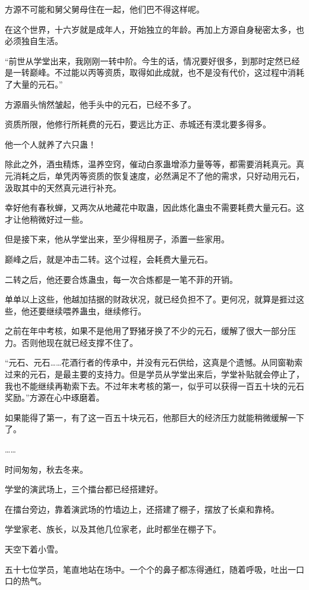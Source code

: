 \begin{this_body}
方源不可能和舅父舅母住在一起，他们巴不得这样呢。

在这个世界，十六岁就是成年人，开始独立的年龄。再加上方源自身秘密太多，也必须独自生活。

“前世从学堂出来，我刚刚一转中阶。今生的话，情况要好很多，到那时定然已经是一转巅峰。不过能以丙等资质，取得如此成就，也不是没有代价，这过程中消耗了大量的元石。”

方源眉头悄然皱起，他手头中的元石，已经不多了。

资质所限，他修行所耗费的元石，要远比方正、赤城还有漠北要多得多。

他一个人就养了六只蛊！

除此之外，酒虫精炼，温养空窍，催动白豕蛊增添力量等等，都需要消耗真元。真元消耗之后，单凭丙等资质的恢复速度，必然满足不了他的需求，只好动用元石，汲取其中的天然真元进行补充。

幸好他有春秋蝉，又两次从地藏花中取蛊，因此炼化蛊虫不需要耗费大量元石。这才让他稍微好过一些。

但是接下来，他从学堂出来，至少得租房子，添置一些家用。

巅峰之后，就是冲击二转。这个过程，会耗费大量元石。

二转之后，他还要合炼蛊虫，每一次合炼都是一笔不菲的开销。

单单以上这些，他越加拮据的财政状况，就已经负担不了。更何况，就算是捱过这些，他还要继续喂养蛊虫，继续修行。

之前在年中考核，如果不是他用了野猪牙换了不少的元石，缓解了很大一部分压力。否则他现在就已经支撑不住了。

“元石、元石……花酒行者的传承中，并没有元石供给，这真是个遗憾。从同窗勒索过来的元石，是最主要的支持力。但是学员从学堂出来后，学堂补贴就会停止了，我也不能继续再勒索下去。不过年末考核的第一，似乎可以获得一百五十块的元石奖励。”方源在心中琢磨着。

如果能得了第一，有了这一百五十块元石，他那巨大的经济压力就能稍微缓解一下了。

……

时间匆匆，秋去冬来。

学堂的演武场上，三个擂台都已经搭建好。

在擂台旁边，靠着演武场的竹墙边上，还搭建了棚子，摆放了长桌和靠椅。

学堂家老、族长，以及其他几位家老，此时都坐在棚子下。

天空下着小雪。

五十七位学员，笔直地站在场中。一个个的鼻子都冻得通红，随着呼吸，吐出一口口的热气。


\end{this_body}
